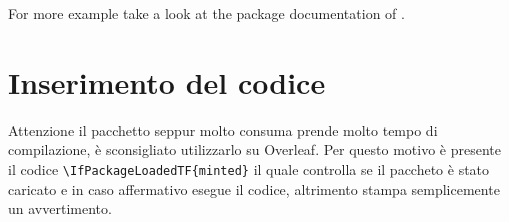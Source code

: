 For more example take a look at the package documentation of .

\section{Inserimento del codice}

Attenzione il pacchetto  seppur molto consuma prende molto tempo di compilazione, è sconsigliato utilizzarlo su Overleaf.
Per questo motivo è presente il codice \verb|\IfPackageLoadedTF{minted}| il quale controlla se il paccheto è stato caricato e in caso affermativo esegue il codice, altrimento stampa semplicemente un avvertimento.

